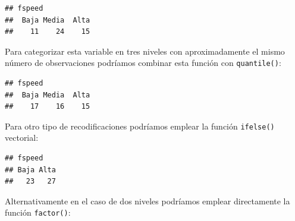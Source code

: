 \documentclass[
]{book}
\newenvironment{Shaded}{\begin{snugshade}}{\end{snugshade}}
\newcommand{\AttributeTok}[1]{\textcolor[rgb]{0.77,0.63,0.00}{#1}}
\newcommand{\DecValTok}[1]{\textcolor[rgb]{0.00,0.00,0.81}{#1}}
\newcommand{\FunctionTok}[1]{\textcolor[rgb]{0.00,0.00,0.00}{#1}}
\newcommand{\NormalTok}[1]{#1}
\newcommand{\OtherTok}[1]{\textcolor[rgb]{0.56,0.35,0.01}{#1}}
\newcommand{\SpecialCharTok}[1]{\textcolor[rgb]{0.00,0.00,0.00}{#1}}
\newcommand{\StringTok}[1]{\textcolor[rgb]{0.31,0.60,0.02}{#1}}
\theoremstyle{break}
\theoremstyle{nonumberplain}
\begin{document}
\begin{verbatim}
## fspeed
##  Baja Media  Alta 
##    11    24    15
\end{verbatim}

Para categorizar esta variable en tres niveles con aproximadamente el mismo número de observaciones podríamos combinar esta función con \texttt{quantile()}:

\begin{Shaded}
\end{Shaded}

\begin{verbatim}
## fspeed
##  Baja Media  Alta 
##    17    16    15
\end{verbatim}

Para otro tipo de recodificaciones podríamos emplear la función \texttt{ifelse()} vectorial:

\begin{Shaded}
\end{Shaded}

\begin{verbatim}
## fspeed
## Baja Alta 
##   23   27
\end{verbatim}

Alternativamente en el caso de dos niveles podríamos emplear directamente la función \texttt{factor()}:
\end{document}
